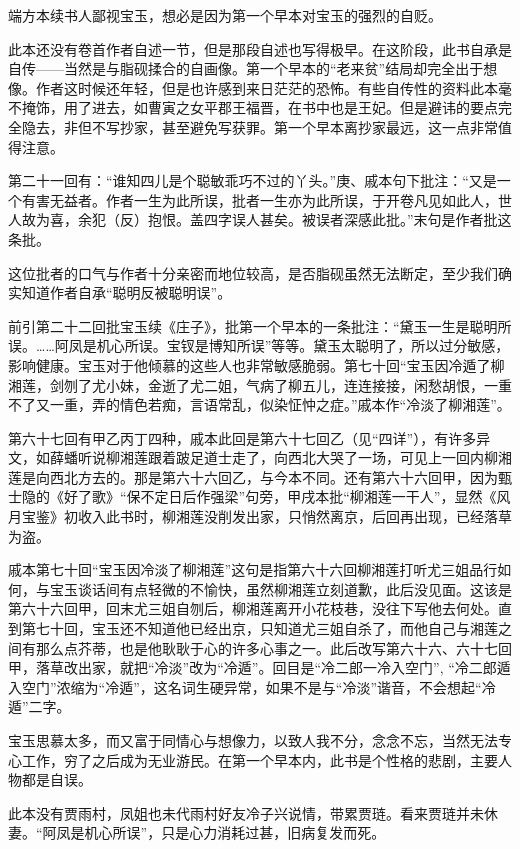 \par 端方本续书人鄙视宝玉，想必是因为第一个早本对宝玉的强烈的自贬。
\par 此本还没有卷首作者自述一节，但是那段自述也写得极早。在这阶段，此书自承是自传——当然是与脂砚揉合的自画像。第一个早本的“老来贫”结局却完全出于想像。作者这时候还年轻，但是也许感到来日茫茫的恐怖。有些自传性的资料此本毫不掩饰，用了进去，如曹寅之女平郡王福晋，在书中也是王妃。但是避讳的要点完全隐去，非但不写抄家，甚至避免写获罪。第一个早本离抄家最远，这一点非常值得注意。
\par 第二十一回有：“谁知四儿是个聪敏乖巧不过的丫头。”庚、戚本句下批注：“又是一个有害无益者。作者一生为此所误，批者一生亦为此所误，于开卷凡见如此人，世人故为喜，余犯（反）抱恨。盖四字误人甚矣。被误者深感此批。”末句是作者批这条批。
\par 这位批者的口气与作者十分亲密而地位较高，是否脂砚虽然无法断定，至少我们确实知道作者自承“聪明反被聪明误”。
\par 前引第二十二回批宝玉续《庄子》，批第一个早本的一条批注：“黛玉一生是聪明所误。……阿凤是机心所误。宝钗是博知所误”等等。黛玉太聪明了，所以过分敏感，影响健康。宝玉对于他倾慕的这些人也非常敏感脆弱。第七十回“宝玉因冷遁了柳湘莲，剑刎了尤小妹，金逝了尤二姐，气病了柳五儿，连连接接，闲愁胡恨，一重不了又一重，弄的情色若痴，言语常乱，似染怔忡之症。”戚本作“冷淡了柳湘莲”。
\par 第六十七回有甲乙丙丁四种，戚本此回是第六十七回乙（见“四详”），有许多异文，如薛蟠听说柳湘莲跟着跛足道士走了，向西北大哭了一场，可见上一回内柳湘莲是向西北方去的。那是第六十六回乙，与今本不同。还有第六十六回甲，因为甄士隐的《好了歌》“保不定日后作强梁”句旁，甲戌本批“柳湘莲一干人”，显然《风月宝鉴》初收入此书时，柳湘莲没削发出家，只悄然离京，后回再出现，已经落草为盗。
\par 戚本第七十回“宝玉因冷淡了柳湘莲”这句是指第六十六回柳湘莲打听尤三姐品行如何，与宝玉谈话间有点轻微的不愉快，虽然柳湘莲立刻道歉，此后没见面。这该是第六十六回甲，回末尤三姐自刎后，柳湘莲离开小花枝巷，没往下写他去何处。直到第七十回，宝玉还不知道他已经出京，只知道尤三姐自杀了，而他自己与湘莲之间有那么点芥蒂，也是他耿耿于心的许多心事之一。此后改写第六十六、六十七回甲，落草改出家，就把“冷淡”改为“冷遁”。回目是“冷二郎一冷入空门”, “冷二郎遁入空门”浓缩为“冷遁”，这名词生硬异常，如果不是与“冷淡”谐音，不会想起“冷遁”二字。
\par 宝玉思慕太多，而又富于同情心与想像力，以致人我不分，念念不忘，当然无法专心工作，穷了之后成为无业游民。在第一个早本内，此书是个性格的悲剧，主要人物都是自误。
\par 此本没有贾雨村，凤姐也未代雨村好友冷子兴说情，带累贾琏。看来贾琏并未休妻。“阿凤是机心所误”，只是心力消耗过甚，旧病复发而死。
